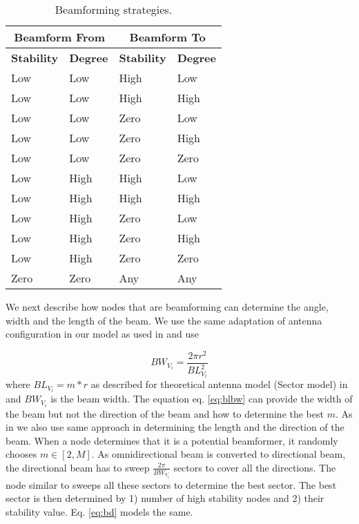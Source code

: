 \documentclass[preprint, twocolumn,5p]{elsarticle}
\begin{document}
\begin{table}
    \centering
    \begin{tabular}{|l|l|l|l|}
        \hline
        \multicolumn{2}{|c|}{\textbf{Beamform From}} & \multicolumn{2}{|c|}{\textbf{Beamform To}}\\
        \hline
        \textbf{Stability} & \textbf{Degree} & \textbf{Stability} & \textbf{Degree}\\
        \hline
        Low & Low & High & Low\\
        Low & Low & High & High\\
        Low & Low & Zero & Low\\
        Low & Low & Zero & High\\
        Low & Low & Zero & Zero\\

        Low & High & High & Low\\
        Low & High & High & High\\
        Low & High & Zero & Low\\
        Low & High & Zero & High\\
        Low & High & Zero & Zero\\

        Zero & Zero & Any & Any\\
        \hline
    \end{tabular}
    \caption{Beamforming strategies.}
    \label{table:beamformer}
\end{table}
We next describe how nodes that are beamforming can determine the angle, width and the length of the beam. We use the same adaptation of antenna configuration in our model as used in \cite{Agarwal2011,Agarwal2012} and use

\begin{equation}\label{eq:blbw}
    BW_{V_{i}}=\frac{2\pi r^2}{BL_{V_{i}}^{2}}
\end{equation}
where $BL_{V_{i}}=m*r$ as described for theoretical antenna model (Sector model) in \cite{Agarwal2012} and $BW_{V_{i}}$ is the beam width. The equation eq. \ref{eq:blbw} can provide the width of the beam but not the direction of the beam and how to determine the best $m$. As in \cite{Agarwal2011,Agarwal2012} we also use same approach in determining the length and the direction of the beam. When a node determines that it is a potential beamformer, it randomly chooses $m\in[2,M]$. As omnidirectional beam is converted to directional beam, the directional beam has to sweep $\frac{2\pi}{BW_{V_{i}}}$ sectors to cover all the directions. The node similar to \cite{Agarwal2011,Agarwal2012} sweeps all these sectors to determine the best sector. The best sector is then determined by 1) number of high stability nodes and 2) their stability value. Eq. \ref{eq:bd} models the same.
\end{document}
